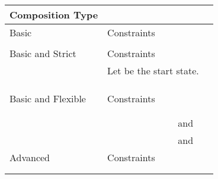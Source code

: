 \documentclass[12pt,journal,letterpaper,onecolumn]{IEEEtran}
\begin{document}
\begin{table}[h]
\begin{center}
\begin{minipage}{6in}
\footnotesize
\begin{center}
\begin{tabular}{|p{3.2cm}|llll|}
\hline
 Composition Type &             &&&\\
\hline \hline
Basic &   Constraints          &&&\\
\hline

 &

 &

 &

 & \\
\hline \hline
 Basic and Strict & Constraints &&&\\
\hline &
\multicolumn{3}{l}{Let  be the start state.} & \\


 &

 &

  &

 & \\



 &

 &  && \\

&  &  && \\

\hline \hline
Basic and Flexible & Constraints &&& \\
\hline

 &

 &

 &

 &\\

& & &  & \\



 &

 &

\multicolumn{2}{l}{ and }& \\

&& \multicolumn{2}{l}{ and } &\\

\hline
\hline Advanced &   Constraints          &&&\\
\hline

 &   &

 & & \\

&& \multicolumn{2}{l}{}&\\


\end{tabular}
\end{center}
\end{minipage}
\end{center}
\end{table}
\end{document}
